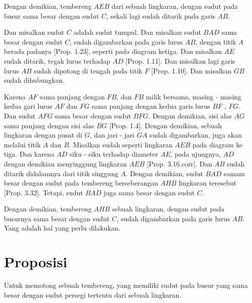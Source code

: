 \documentclass[a4paper]{book}
\begin{document}
Dengan demikian, tembereng $AEB$ dari sebuah lingkaran, dengan sudut pada busur sama
besar dengan sudut $C$, sekali lagi sudah ditarik pada garis $AB$.

Dan misalkan sudut $C$ adalah sudut tumpul. Dan misalkan sudut $BAD$ sama besar 
dengan sudut $C$, sudah digambarkan pada garis lurus $AB$, dengan titik $A$ berada
padanya [Prop. 1.23], seperti pada diagram ketiga. Dan misalkan $AE$ sudah ditarik,
tegak lurus terhadap $AD$ [Prop. 1.11]. Dan misalkan lagi garis lurus $AB$ sudah
dipotong di tengah pada titik $F$ [Prop. 1.10]. Dan misalkan $GB$ sudah dihubungkan.

Karena $AF$ sama panjang dengan $FB$, dan $FB$ milik bersama, masing - masing kedua 
gari lurus $AF$ dan $FG$ sama panjang dengan kedua garis lurus $BF$ , $FG$. Dan 
sudut $AFG$ sama besar dengan sudut $BFG$. Dengan demikian, sisi alas $AG$ sama
panjang dengan sisi alas $BG$ [Prop. 1.4]. Dengan demikian, sebuah lingkaran
dengan pusat di $G$, dan jari - jari $GA$ sudah digambarkan, juga akan melalui titik
$A$ dan $B$. Misalkan sudah seperti lingkaran $AEB$ pada diagram ke tiga. Dan karena
$AD$ siku - siku terhadap diameter $AE$, pada ujungnya, $AD$ dengan demikian 
menyinggung lingkaran $AEB$ [Prop. 3.16.corr]. Dan $AB$ sudah ditarik didalamnya
dari titik singgung $A$. Dengan demikian, sudut $BAD$ samam besar dengan sudut 
pada tembereng berseberangan $AHB$ lingkaran teresebut [Prop. 3.32]. Tetapi,
sudut $BAD$ juga sama besar dengan sudut $C$.

Dengan demikian, tembereng $AHB$ sebuah lingkaran, dengan sudut pada busurnya sama
besar dengan sudut $C$, sudah digambarkan pada garis lurus $AB$. Yang adalah
hal yang perlu dilakukan.

\section*{\centering Proposisi \thesection}
Untuk memotong sebuah tembereng, yang memiliki sudut pada busur yang sama besar
dengan sudut persegi tertentu dari sebuah lingkaran.

\begin{center}
\end{center}
\end{document}
